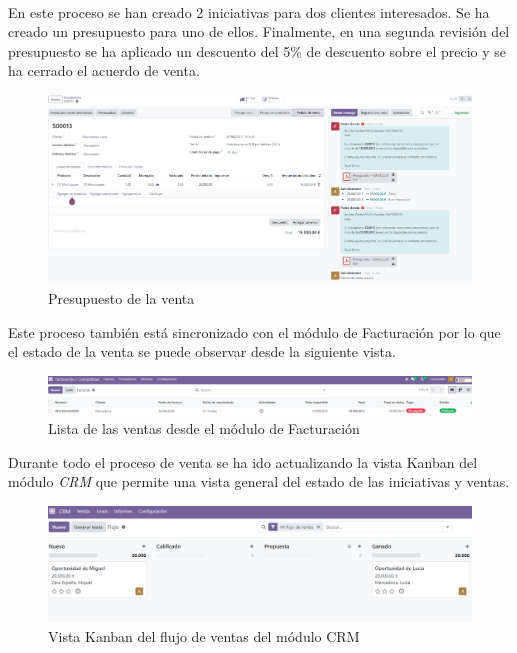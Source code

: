 \paragraph{}    
En este proceso se han creado 2 iniciativas para dos clientes interesados. Se ha creado un presupuesto para uno de ellos. Finalmente, en una segunda revisión del presupuesto se ha aplicado un descuento del 5\% de descuento sobre el precio y se ha cerrado el acuerdo de venta.
\begin{figure}[h]
    \centering
    \includegraphics[width=1\linewidth]{fotosRelacion/presupuesto.png}
    \caption{Presupuesto de la venta}
    \label{fig:enter-label}
\end{figure}
Este proceso también está sincronizado con el módulo de Facturación por lo que el estado de la venta se puede observar desde la siguiente vista.
\newpage
\begin{figure}[h]
    \centering
    \includegraphics[width=1\linewidth]{fotosRelacion/facturacion.png}
    \caption{Lista de las ventas desde el módulo de Facturación}
    \label{fig:enter-label}
\end{figure}
Durante todo el proceso de venta se ha ido actualizando la vista Kanban del módulo \textit{CRM} que permite una vista general del estado de las iniciativas y ventas.
\begin{figure}[h]
    \centering
    \includegraphics[width=1\linewidth]{fotosRelacion/kanban.png}
    \caption{Vista Kanban del flujo de ventas del módulo CRM}
    \label{fig:enter-label}
\end{figure}
